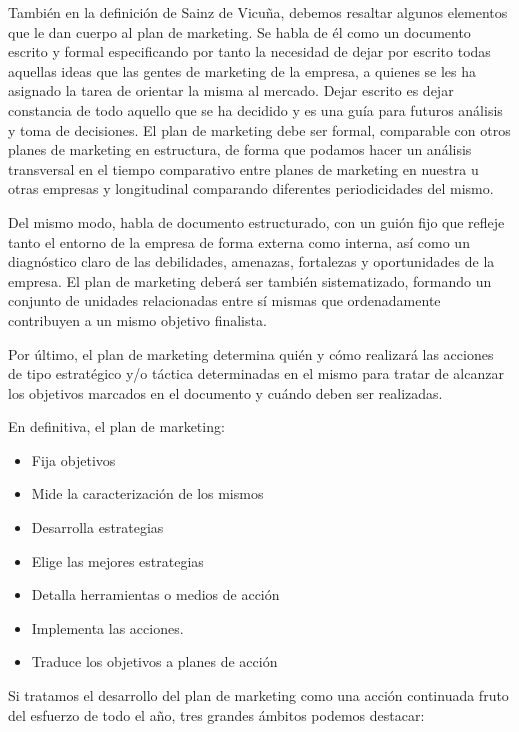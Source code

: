 \documentclass[
]{book}
\providecommand{\tightlist}{%
  \setlength{\itemsep}{0pt}\setlength{\parskip}{0pt}}
\begin{document}
También en la definición de Sainz de Vicuña, debemos resaltar algunos elementos que le dan cuerpo al plan de marketing. Se habla de él como un documento escrito y formal especificando por tanto la necesidad de dejar por escrito todas aquellas ideas que las gentes de marketing de la empresa, a quienes se les ha asignado la tarea de orientar la misma al mercado. Dejar escrito es dejar constancia de todo aquello que se ha decidido y es una guía para futuros análisis y toma de decisiones. El plan de marketing debe ser formal, comparable con otros planes de marketing en estructura, de forma que podamos hacer un análisis transversal en el tiempo comparativo entre planes de marketing en nuestra u otras empresas y longitudinal comparando diferentes periodicidades del mismo.

Del mismo modo, habla de documento estructurado, con un guión fijo que refleje tanto el entorno de la empresa de forma externa como interna, así como un diagnóstico claro de las debilidades, amenazas, fortalezas y oportunidades de la empresa. El plan de marketing deberá ser también sistematizado, formando un conjunto de unidades relacionadas entre sí mismas que ordenadamente contribuyen a un mismo objetivo finalista.

Por último, el plan de marketing determina quién y cómo realizará las acciones de tipo estratégico y/o táctica determinadas en el mismo para tratar de alcanzar los objetivos marcados en el documento y cuándo deben ser realizadas.

En definitiva, el plan de marketing:

\begin{itemize}
\tightlist
\item
  Fija objetivos
\item
  Mide la caracterización de los mismos
\item
  Desarrolla estrategias
\item
  Elige las mejores estrategias
\item
  Detalla herramientas o medios de acción
\item
  Implementa las acciones.
\item
  Traduce los objetivos a planes de acción
\end{itemize}

Si tratamos el desarrollo del plan de marketing como una acción continuada fruto del esfuerzo de todo el año, tres grandes ámbitos podemos destacar:
\end{document}
